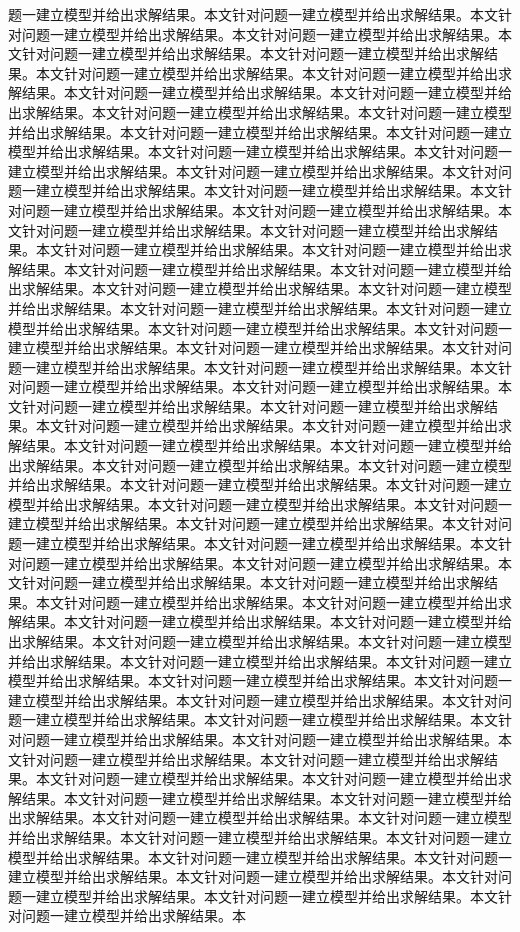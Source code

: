 题一建立模型并给出求解结果。本文针对问题一建立模型并给出求解结果。本文针对问题一建立模型并给出求解结果。本文针对问题一建立模型并给出求解结果。本文针对问题一建立模型并给出求解结果。本文针对问题一建立模型并给出求解结果。本文针对问题一建立模型并给出求解结果。本文针对问题一建立模型并给出求解结果。本文针对问题一建立模型并给出求解结果。本文针对问题一建立模型并给出求解结果。本文针对问题一建立模型并给出求解结果。本文针对问题一建立模型并给出求解结果。本文针对问题一建立模型并给出求解结果。本文针对问题一建立模型并给出求解结果。本文针对问题一建立模型并给出求解结果。本文针对问题一建立模型并给出求解结果。本文针对问题一建立模型并给出求解结果。本文针对问题一建立模型并给出求解结果。本文针对问题一建立模型并给出求解结果。本文针对问题一建立模型并给出求解结果。本文针对问题一建立模型并给出求解结果。本文针对问题一建立模型并给出求解结果。本文针对问题一建立模型并给出求解结果。本文针对问题一建立模型并给出求解结果。本文针对问题一建立模型并给出求解结果。本文针对问题一建立模型并给出求解结果。本文针对问题一建立模型并给出求解结果。本文针对问题一建立模型并给出求解结果。本文针对问题一建立模型并给出求解结果。本文针对问题一建立模型并给出求解结果。本文针对问题一建立模型并给出求解结果。本文针对问题一建立模型并给出求解结果。本文针对问题一建立模型并给出求解结果。本文针对问题一建立模型并给出求解结果。本文针对问题一建立模型并给出求解结果。本文针对问题一建立模型并给出求解结果。本文针对问题一建立模型并给出求解结果。本文针对问题一建立模型并给出求解结果。本文针对问题一建立模型并给出求解结果。本文针对问题一建立模型并给出求解结果。本文针对问题一建立模型并给出求解结果。本文针对问题一建立模型并给出求解结果。本文针对问题一建立模型并给出求解结果。本文针对问题一建立模型并给出求解结果。本文针对问题一建立模型并给出求解结果。本文针对问题一建立模型并给出求解结果。本文针对问题一建立模型并给出求解结果。本文针对问题一建立模型并给出求解结果。本文针对问题一建立模型并给出求解结果。本文针对问题一建立模型并给出求解结果。本文针对问题一建立模型并给出求解结果。本文针对问题一建立模型并给出求解结果。本文针对问题一建立模型并给出求解结果。本文针对问题一建立模型并给出求解结果。本文针对问题一建立模型并给出求解结果。本文针对问题一建立模型并给出求解结果。本文针对问题一建立模型并给出求解结果。本文针对问题一建立模型并给出求解结果。本文针对问题一建立模型并给出求解结果。本文针对问题一建立模型并给出求解结果。本文针对问题一建立模型并给出求解结果。本文针对问题一建立模型并给出求解结果。本文针对问题一建立模型并给出求解结果。本文针对问题一建立模型并给出求解结果。本文针对问题一建立模型并给出求解结果。本文针对问题一建立模型并给出求解结果。本文针对问题一建立模型并给出求解结果。本文针对问题一建立模型并给出求解结果。本文针对问题一建立模型并给出求解结果。本文针对问题一建立模型并给出求解结果。本文针对问题一建立模型并给出求解结果。本文针对问题一建立模型并给出求解结果。本文针对问题一建立模型并给出求解结果。本文针对问题一建立模型并给出求解结果。本文针对问题一建立模型并给出求解结果。本文针对问题一建立模型并给出求解结果。本文针对问题一建立模型并给出求解结果。本文针对问题一建立模型并给出求解结果。本文针对问题一建立模型并给出求解结果。本文针对问题一建立模型并给出求解结果。本文针对问题一建立模型并给出求解结果。本文针对问题一建立模型并给出求解结果。本文针对问题一建立模型并给出求解结果。本文针对问题一建立模型并给出求解结果。本文针对问题一建立模型并给出求解结果。本文针对问题一建立模型并给出求解结果。本文针对问题一建立模型并给出求解结果。本文针对问题一建立模型并给出求解结果。本